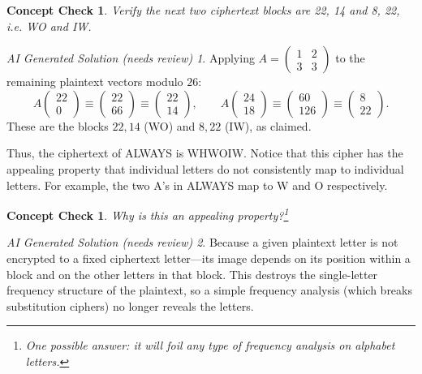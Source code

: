\documentclass{article}
\theoremstyle{plain}
\newtheorem{checkin}[theorem]{Concept Check}
\theoremstyle{definition}
\theoremstyle{remark}
\newtheorem*{aisolution}{AI Generated Solution (needs review)}
\numberwithin{theorem}{section}
\begin{document}
\begin{checkin}
    Verify the next two ciphertext blocks are 22, 14 and 8, 22, i.e. WO and IW.
\end{checkin}
\begin{aisolution}
Applying $A = \left(\begin{smallmatrix} 1 & 2 \\ 3 & 3\end{smallmatrix}\right)$ to the remaining plaintext vectors modulo $26$:
\[
A\begin{pmatrix} 22 \\ 0 \end{pmatrix} \equiv \begin{pmatrix} 22 \\ 66 \end{pmatrix} \equiv \begin{pmatrix} 22 \\ 14 \end{pmatrix}, \qquad
A\begin{pmatrix} 24 \\ 18 \end{pmatrix} \equiv \begin{pmatrix} 60 \\ 126 \end{pmatrix} \equiv \begin{pmatrix} 8 \\ 22 \end{pmatrix}.
\]
These are the blocks $22,14$ (WO) and $8,22$ (IW), as claimed.
\end{aisolution}

Thus, the ciphertext of ALWAYS is WHWOIW.  Notice that this cipher has the appealing property that individual letters do not consistently map to individual letters.  For example, the two A's in ALWAYS map to W and O respectively.

\begin{checkin}
Why is this an appealing property?\footnote{One possible answer:  it will foil any type of frequency analysis on alphabet letters.}
\end{checkin}
\begin{aisolution}
Because a given plaintext letter is not encrypted to a fixed ciphertext letter---its image depends on its position within a block and on the other letters in that block.  This destroys the single-letter frequency structure of the plaintext, so a simple frequency analysis (which breaks substitution ciphers) no longer reveals the letters.
\end{aisolution}
\end{document}
